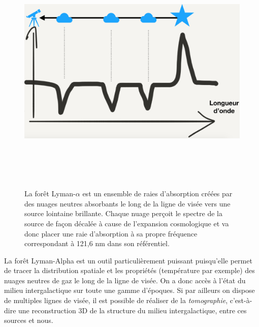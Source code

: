 \begin{figure}[htbp]
	\centering
		\includegraphics[height=12cm]{figs/lya.png}
		\caption[Principe de la forêt Lyman-$\alpha$]{La forêt Lyman-$\alpha$ est un ensemble de raies d'absorption créées par des nuages neutres absorbants le long de la ligne de visée vers une source lointaine brillante. Chaque nuage perçoit le spectre de la source de façon décalée à cause de l'expansion cosmologique et va donc placer une raie d'absorption à sa propre fréquence correspondant à 121,6 nm dans son référentiel.}
	\label{f:lya}
\end{figure}

La forêt Lyman-Alpha est un outil particulièrement puissant puisqu'elle permet de tracer la distribution spatiale et les propriétés (température par exemple) des nuages neutres de gaz le long de la ligne de visée. On a donc accès à l'état du milieu intergalactique sur toute une gamme d'époques. Si par ailleurs on dispose de multiples lignes de visée, il est possible de réaliser de la \textit{tomographie}, c'est-à-dire une reconstruction 3D de la structure du milieu intergalactique, entre ces sources et nous.

